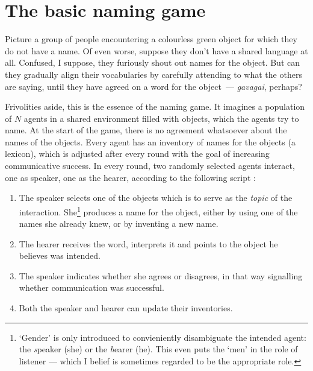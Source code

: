 \documentclass{../src/bcthesispart}
\begin{document}
\section{The basic naming game}

Picture a group of people encountering a colourless green object for which they do not have a name. 
Of even worse, suppose they don’t have a shared language at all.
Confused, I suppose, they furiously shout out names for the object.
But can they gradually align their vocabularies by carefully attending to what the others are saying, until they have agreed on a word for the object —
\emph{gavagai}, perhaps?



Frivolities aside, this is the essence of the naming game.
It imagines a population of $N$ agents in a shared environment filled with objects, which the agents try to name.
At the start of the game, there is no agreement whatsoever about the names of the objects.
Every agent has an inventory of names for the objects (a lexicon), which is adjusted after every round with the goal of increasing communicative success.
In every round, two randomly selected agents interact, one as speaker, one as the hearer, according to the following script \parencite{Wellens2012}:
\begin{enumerate}
	\item The speaker selects one of the objects which is to serve as the \emph{topic} of the interaction. She\footnote{%
			‘Gender’ is only introduced to convieniently disambiguate the intended agent: the \emph{s}peaker (she) or the \emph{h}earer (he).
			This even puts the ‘men’ in the role of listener — which I belief is sometimes regarded to be the appropriate role.
		}
		produces a name for the object, either by using one of the names she already knew, or by inventing a new name.
		
	\item The hearer receives the word, interprets it and points to the object he believes was intended.
	
	\item The speaker indicates whether she agrees or disagrees, in that way signalling whether communication was successful.
	
	\item Both the speaker and hearer can update their inventories.
\end{enumerate}
\end{document}
